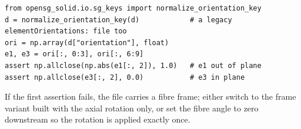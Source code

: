 \begin{lstlisting}[style=opensg,caption={The orientation precheck from Rules/orientation\_e1\_out\_of\_plane.md.}]
from opensg_solid.io.sg_keys import normalize_orientation_key
d = normalize_orientation_key(d)            # a legacy elementOrientations: file too
ori = np.array(d["orientation"], float)
e1, e3 = ori[:, 0:3], ori[:, 6:9]
assert np.allclose(np.abs(e1[:, 2]), 1.0)   # e1 out of plane
assert np.allclose(e3[:, 2], 0.0)           # e3 in plane
\end{lstlisting}

If the first assertion fails, the file carries a fibre frame; either switch to
the frame variant built with the axial rotation only, or set the fibre angle to
zero downstream so the rotation is applied exactly once.
